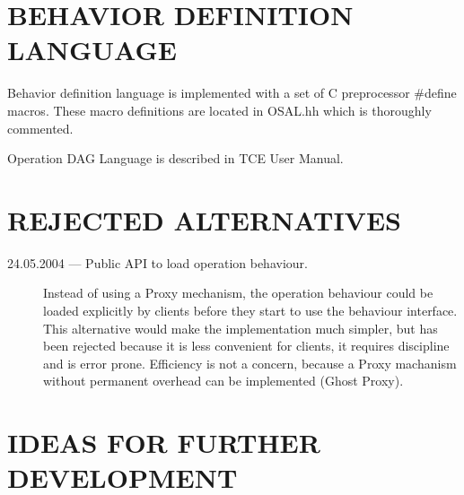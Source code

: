 \documentclass[a4paper,twoside]{tce}
\begin{document}
\chapter{BEHAVIOR DEFINITION LANGUAGE}
\label{cha:language}

Behavior definition language is implemented with a set of C preprocessor
\#define macros. These macro definitions are located in OSAL.hh which is
thoroughly commented.

Operation DAG Language is described in TCE User Manual.

\chapter{REJECTED ALTERNATIVES}

%
\begin{description}
\item[24.05.2004 --- Public API to load operation behaviour.] %
  Instead of using a Proxy mechanism, the operation behaviour could be
  loaded explicitly by clients before they start to use the behaviour
  interface.  This alternative would make the implementation much simpler,
  but has been rejected because it is less convenient for clients, it
  requires discipline and is error prone.  Efficiency is not a concern,
  because a Proxy machanism without permanent overhead can be implemented
  (Ghost Proxy).
\end{description}


\chapter{IDEAS FOR FURTHER DEVELOPMENT}

\end{document}
